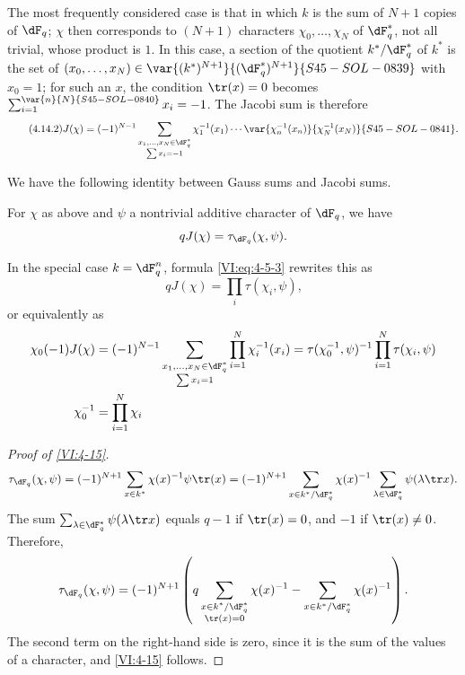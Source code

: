 The most frequently considered case is that in which $k$ is the sum of $N+1$
copies of $\dF_q$; $\chi$ then corresponds to $(N+1)$ characters
$\chi_0,\ldots,\chi_N$ of $\dF_q^\ast$, not all trivial, whose product is $1$.
In this case, a section of the quotient $k^\ast/\dF_q^\ast$ of $k^\ast$
is the set of $(x_0,\ldots,x_N)\in\var{(k^\ast)^{N+1}}{(\dF_q^\ast)^{N+1}}{S45-SOL-0839}$ with $x_0=1$;
for such an $x$, the condition $\tr(x)=0$ becomes $\sum_{i=1}^{\var{n}{N}{S45-SOL-0840}}x_i=-1$.
The Jacobi sum is therefore
\begin{equation*}\tag{4.14.2}\label{VI:eq:4-14-2}
 J(\chi)=(-1)^{N-1}\sum_{\substack{x_1,\ldots,x_N\in\dF_q^\ast\\\sum x_i=-1}}
 \chi_1^{-1}(x_1)\cdots\var{\chi_n^{-1}(x_n)}{\chi_N^{-1}(x_N)}{S45-SOL-0841} \text{.}
\end{equation*}

We have the following identity between Gauss sums and Jacobi sums. 





\begin{proposition_}\label{VI:4-15}
For $\chi$ as above and $\psi$ a nontrivial additive character of 
$\dF_q$, we have 
\[
  q J(\chi) = \tau_{\dF_q}(\chi,\psi) \text{.} 
\]
\end{proposition_}

In the special case $k=\dF_q^n$, formula \eqref{VI:eq:4-5-3} rewrites this as 
\begin{equation*}\tag{4.15.1}\label{VI:eq:4-15-1}
  q J(\chi) = \prod_i \tau(\chi_i,\psi) \text{,} 
\end{equation*}
or equivalently as 
\begin{align*}
  \chi_0(-1) J(\chi) &= (-1)^{N-1} \sum_{\substack{x_1,\dots,x_N\in \dF_q^\ast \\ \sum x_i = 1}} \prod_{i=1}^N \chi_i^{-1}(x_i) = \tau(\chi_0^{-1},\psi)^{-1} \prod_{i=1}^N \tau(\chi_i,\psi) \\
  \chi_0^{-1} &= \prod_{i=1}^N \chi_i 
\end{align*}





\begin{proof}[Proof of \ref{VI:4-15}]
\[
  \tau_{\dF_q}(\chi,\psi) = (-1)^{N+1} \sum_{x\in k^\ast} \chi(x)^{-1} \psi \tr(x) = (-1)^{N+1} \sum_{x\in k^\ast/\dF_q^\ast} \chi(x)^{-1} \sum_{\lambda\in \dF_q^\ast} \psi(\lambda \tr x) \text{.}
\]
The sum $\sum_{\lambda\in \dF_q^\ast} \psi(\lambda \tr x)$ equals $q-1$ if 
$\tr(x)=0$, and $-1$ if $\tr(x)\ne 0$. Therefore, 
\[
  \tau_{\dF_q}(\chi,\psi) = (-1)^{N+1} \left(q\sum_{\substack{x\in k^\ast/\dF_q^\ast \\ \tr(x)=0}} \chi(x)^{-1} - \sum_{x\in k^\ast/\dF_q^\ast} \chi(x)^{-1}\right) \text{.}
\]
The second term on the right-hand side is zero, since it is the sum of the values 
of a character, and \ref{VI:4-15} follows. 
\end{proof}

